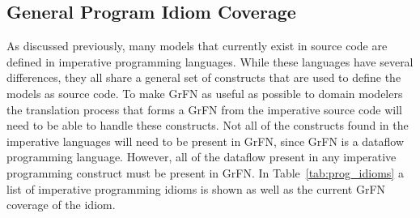 \subsection{General Program Idiom Coverage\label{sec:supported_program_constructs}}
As discussed previously, many models that currently exist in source code are defined in imperative programming languages.
While these languages have several differences, they all share a general set of constructs that are used to define the models as source code.
To make GrFN as useful as possible to domain modelers the translation process that forms a GrFN from the imperative source code will need to be able to handle these constructs.
Not all of the constructs found in the imperative languages will need to be present in GrFN, since GrFN is a dataflow programming language.
However, all of the dataflow present in any imperative programming construct must be present in GrFN.
In Table~\ref{tab:prog_idioms} a list of imperative programming idioms is shown as well as the current GrFN coverage of the idiom.

